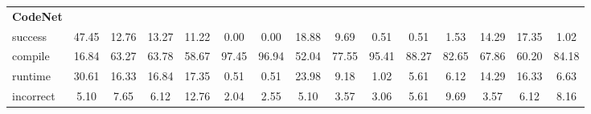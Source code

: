 \begin{table}[t]
\begin{tabular}{@{}lcccccccccccccc@{}}
\textbf{CodeNet} & & & & & & & & & & & & & & \\ 
\quad success & 47.45 & 12.76 & 13.27 & 11.22 & 0.00 & 0.00 & 18.88 & 9.69 & 0.51 & 0.51 & 1.53 & 14.29 & 17.35 & 1.02 \\
\qquad compile & 16.84 & 63.27 & 63.78 & 58.67 & 97.45 & 96.94 & 52.04 & 77.55 & 95.41 & 88.27 & 82.65 & 67.86 & 60.20 & 84.18 \\
\qquad runtime & 30.61 & 16.33 & 16.84 & 17.35 & 0.51 & 0.51 & 23.98 & 9.18 & 1.02 & 5.61 & 6.12 & 14.29 & 16.33 & 6.63 \\
\qquad incorrect & 5.10 & 7.65 & 6.12 & 12.76 & 2.04 & 2.55 & 5.10 & 3.57 & 3.06 & 5.61 & 9.69 & 3.57 & 6.12 & 8.16 \\
 

\bottomrule
\end{tabular}
\end{table}





